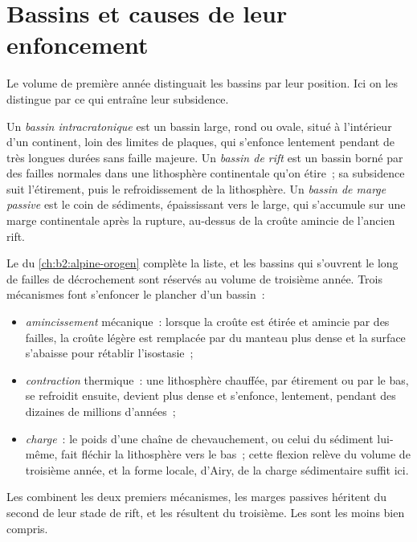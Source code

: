 \section{Bassins et causes de leur enfoncement}\label{sec:b2:basins-compared:types}

Le volume de première année distinguait les bassins par leur position. Ici on les distingue
par ce qui entraîne leur subsidence.

\begin{definition}\label{def:b2:basins-compared:types}
Un \emph{bassin intracratonique} est un bassin large, rond ou ovale, situé à l'intérieur
d'un continent, loin des limites de plaques, qui s'enfonce lentement pendant de très longues durées
sans faille majeure. Un \emph{bassin de rift} est un bassin borné par des failles
normales dans une lithosphère continentale qu'on étire~; sa subsidence suit l'étirement, puis le refroidissement
de la lithosphère. Un \emph{bassin de marge passive} est le coin de sédiments,
épaississant vers le large, qui s'accumule sur une marge continentale après la rupture, au-dessus de la croûte amincie
de l'ancien rift.
\end{definition}

Le  du \cref{ch:b2:alpine-orogen} complète la liste, et les bassins qui s'ouvrent
le long de failles de décrochement sont réservés au volume de troisième année. Trois mécanismes font
s'enfoncer le plancher d'un bassin~:
\begin{itemize}
  \item \emph{amincissement} mécanique~: lorsque la croûte est étirée et amincie par des failles, la croûte
        légère est remplacée par du manteau plus dense et la surface s'abaisse pour rétablir l'isostasie~;
  \item \emph{contraction} thermique~: une lithosphère chauffée, par étirement ou par le bas, se refroidit
        ensuite, devient plus dense et s'enfonce, lentement, pendant des dizaines de millions d'années~;
  \item \emph{charge}~: le poids d'une chaîne de chevauchement, ou celui du sédiment lui-même, fait fléchir
        la lithosphère vers le bas~; cette flexion relève du volume de troisième année, et la forme locale,
        d'Airy, de la charge sédimentaire suffit ici.
\end{itemize}
Les  combinent les deux premiers mécanismes, les marges passives héritent du second de leur
stade de rift, et les  résultent du troisième. Les  sont les moins bien compris.

